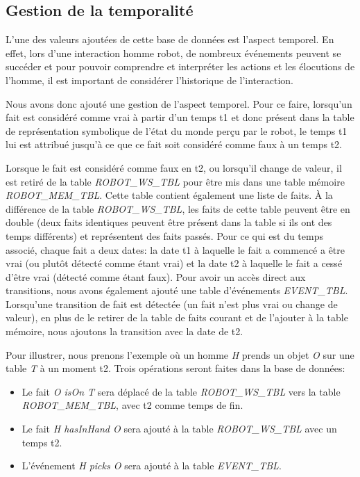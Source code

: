 \documentclass[a4paper,11pt,twoside]{StyleThese}
\begin{document}
\subsection{Gestion de la temporalité}
\label{sec:dbt}
L'une des valeurs ajoutées de cette base de données est l'aspect temporel.
En effet, lors d'une interaction homme robot, de nombreux événements peuvent se succéder et pour pouvoir comprendre et interpréter les actions et les élocutions de l'homme, il est important de considérer l'historique de l'interaction.

Nous avons donc ajouté une gestion de l'aspect temporel.
Pour ce faire, lorsqu'un fait est considéré comme vrai à partir d'un temps t1 et donc présent dans la table de représentation symbolique de l'état du monde perçu par le robot, le temps t1 lui est attribué jusqu'à ce que ce fait soit considéré comme faux à un temps t2.

Lorsque le fait est considéré comme faux en t2, ou lorsqu'il change de valeur, il est retiré de la table \textit{ROBOT\_WS\_TBL} pour être mis dans une table mémoire \textit{ROBOT\_MEM\_TBL}. Cette table contient également une liste de faits. À la différence de la table \textit{ROBOT\_WS\_TBL}, les faits de cette table peuvent être en double (deux faits identiques peuvent être présent dans la table si ils ont des temps différents) et représentent des faits passés. Pour ce qui est du temps associé, chaque fait a deux dates: la date t1 à laquelle le fait a commencé a être vrai (ou plutôt détecté comme étant vrai) et la date t2 à laquelle le fait a cessé d'être vrai (détecté comme étant faux).
Pour avoir un accès direct aux transitions, nous avons également ajouté une table d'événements \textit{EVENT\_TBL}. Lorsqu'une transition de fait est détectée (un fait n'est plus vrai ou change de valeur), en plus de le retirer de la table de faits courant et de l'ajouter à la table mémoire, nous ajoutons la transition avec la date de t2. 

Pour illustrer, nous prenons l'exemple où un homme \textit{H} prends un objet \textit{O} sur une table \textit{T} à un moment t2. Trois opérations seront faites dans la base de données:

\begin{itemize}
\item Le fait \textit{O isOn T} sera déplacé de la table \textit{ROBOT\_WS\_TBL} vers la table \textit{ROBOT\_MEM\_TBL}, avec t2 comme temps de fin.
\item Le fait  \textit{H hasInHand O} sera ajouté à la table \textit{ROBOT\_WS\_TBL} avec un temps t2.
\item L'événement \textit{H picks O} sera ajouté à la table \textit{EVENT\_TBL}.
\end{itemize}
\end{document}
